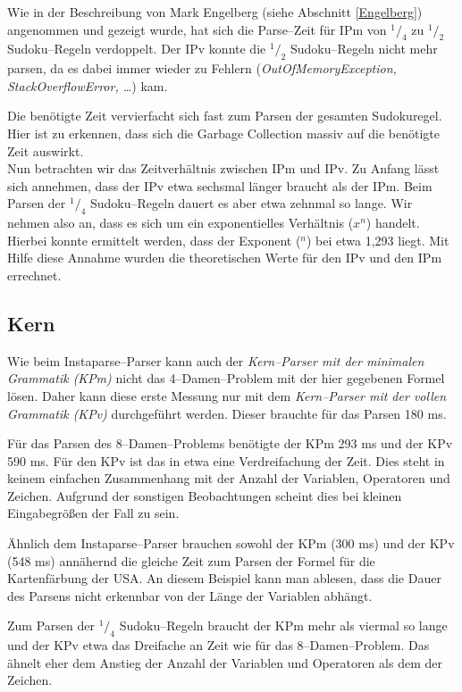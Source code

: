 \documentclass[ngerman,a4paper,abstracton,open=right,twoside=false,toc=listofnumbered,bibtotocnumbered]{scrreprt}
\begin{document}
Wie in der Beschreibung von Mark Engelberg (siehe Abschnitt \ref{Engelberg}) angenommen und gezeigt wurde, hat sich die Parse--Zeit für IPm von $^1/_4$ zu $^1/_2$ Sudoku--Regeln verdoppelt. Der IPv konnte die $^1/_2$ Sudoku--Regeln nicht mehr parsen, da es dabei immer wieder zu Fehlern (\emph{OutOfMemoryException, StackOverflowError, \dots}) kam.

Die benötigte Zeit vervierfacht sich fast zum Parsen der gesamten Sudokuregel. Hier ist zu erkennen, dass sich die Garbage Collection massiv auf die benötigte Zeit auswirkt.\\

Nun betrachten wir das Zeitverhältnis zwischen IPm und IPv. Zu Anfang lässt sich annehmen, dass der IPv etwa sechsmal länger braucht als der IPm. Beim Parsen der $^1/_4$ Sudoku--Regeln dauert es aber etwa zehnmal so lange. Wir nehmen also an, dass es sich um ein exponentielles Verhältnis ($x^n$) handelt. Hierbei konnte ermittelt werden, dass der Exponent ($^n$) bei etwa 1,293 liegt. Mit Hilfe diese Annahme wurden die theoretischen Werte für den IPv und den IPm errechnet.

\subsection{Kern}

Wie beim Instaparse--Parser kann auch der \emph{Kern--Parser mit der minimalen Grammatik (KPm)} nicht das 4--Damen--Problem mit der hier gegebenen Formel lösen. Daher kann diese erste Messung nur mit dem \emph{Kern--Parser mit der vollen Grammatik (KPv)} durchgeführt werden. Dieser brauchte für das Parsen 180 ms.

Für das Parsen des 8--Damen--Problems benötigte der KPm 293 ms und der KPv 590 ms. Für den KPv ist das in etwa eine Verdreifachung der Zeit. Dies steht in keinem einfachen Zusammenhang mit der Anzahl der Variablen, Operatoren und Zeichen. Aufgrund der sonstigen Beobachtungen scheint dies bei kleinen Eingabegrößen der Fall zu sein.

Ähnlich dem Instaparse--Parser brauchen sowohl der KPm (300 ms) und der KPv (548 ms) annähernd die gleiche Zeit zum Parsen der Formel für die Kartenfärbung der USA. An diesem Beispiel kann man ablesen, dass die Dauer des Parsens nicht erkennbar von der Länge der Variablen abhängt.

Zum Parsen der $^1/_4$ Sudoku--Regeln braucht der KPm mehr als viermal so lange und der KPv etwa das Dreifache an Zeit wie für das 8--Damen--Problem. Das ähnelt eher dem Anstieg der Anzahl der Variablen und Operatoren als dem der Zeichen.
\end{document}
